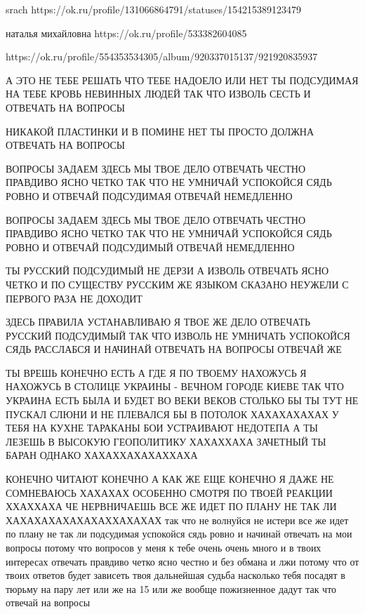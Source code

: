  
 
 
 
 

srach
https://ok.ru/profile/131066864791/statuses/154215389123479

наталья михайловна
https://ok.ru/profile/533382604085

https://ok.ru/profile/554353534305/album/920337015137/921920835937

А ЭТО НЕ ТЕБЕ РЕШАТЬ ЧТО ТЕБЕ НАДОЕЛО ИЛИ НЕТ ТЫ ПОДСУДИМАЯ НА ТЕБЕ КРОВЬ
НЕВИННЫХ ЛЮДЕЙ ТАК ЧТО ИЗВОЛЬ СЕСТЬ И ОТВЕЧАТЬ НА ВОПРОСЫ

НИКАКОЙ ПЛАСТИНКИ И В ПОМИНЕ НЕТ ТЫ ПРОСТО ДОЛЖНА ОТВЕЧАТЬ НА ВОПРОСЫ

ВОПРОСЫ ЗАДАЕМ ЗДЕСЬ МЫ ТВОЕ ДЕЛО ОТВЕЧАТЬ ЧЕСТНО ПРАВДИВО ЯСНО ЧЕТКО ТАК ЧТО
НЕ УМНИЧАЙ УСПОКОЙСЯ СЯДЬ РОВНО И ОТВЕЧАЙ ПОДСУДИМАЯ ОТВЕЧАЙ НЕМЕДЛЕННО

ВОПРОСЫ ЗАДАЕМ ЗДЕСЬ МЫ ТВОЕ ДЕЛО ОТВЕЧАТЬ ЧЕСТНО ПРАВДИВО ЯСНО ЧЕТКО ТАК ЧТО
НЕ УМНИЧАЙ УСПОКОЙСЯ СЯДЬ РОВНО И ОТВЕЧАЙ ПОДСУДИМЫЙ ОТВЕЧАЙ НЕМЕДЛЕННО

ТЫ РУССКИЙ ПОДСУДИМЫЙ НЕ ДЕРЗИ А ИЗВОЛЬ ОТВЕЧАТЬ ЯСНО ЧЕТКО И ПО СУЩЕСТВУ
РУССКИМ ЖЕ ЯЗЫКОМ СКАЗАНО НЕУЖЕЛИ С ПЕРВОГО РАЗА НЕ ДОХОДИТ

ЗДЕСЬ ПРАВИЛА УСТАНАВЛИВАЮ Я ТВОЕ ЖЕ ДЕЛО ОТВЕЧАТЬ РУССКИЙ ПОДСУДИМЫЙ ТАК ЧТО
ИЗВОЛЬ НЕ УМНИЧАТЬ УСПОКОЙСЯ СЯДЬ РАССЛАБСЯ И НАЧИНАЙ ОТВЕЧАТЬ НА ВОПРОСЫ
ОТВЕЧАЙ ЖЕ

ТЫ ВРЕШЬ КОНЕЧНО ЕСТЬ А ГДЕ Я ПО ТВОЕМУ НАХОЖУСЬ Я НАХОЖУСЬ В СТОЛИЦЕ УКРАИНЫ -
ВЕЧНОМ ГОРОДЕ КИЕВЕ ТАК ЧТО УКРАИНА ЕСТЬ БЫЛА И БУДЕТ ВО ВЕКИ ВЕКОВ СТОЛЬКО БЫ
ТЫ ТУТ НЕ ПУСКАЛ СЛЮНИ И НЕ ПЛЕВАЛСЯ БЫ В ПОТОЛОК ХАХАХАХАХАХ У ТЕБЯ НА КУХНЕ
ТАРАКАНЫ БОИ УСТРАИВАЮТ НЕДОТЕПА А ТЫ ЛЕЗЕШЬ В ВЫСОКУЮ ГЕОПОЛИТИКУ ХАХАХХАХА
ЗАЧЕТНЫЙ ТЫ БАРАН ОДНАКО ХАХАХХАХАХАХХАХА

КОНЕЧНО ЧИТАЮТ КОНЕЧНО А КАК ЖЕ ЕЩЕ КОНЕЧНО Я ДАЖЕ НЕ СОМНЕВАЮСЬ ХАХАХАХ
ОСОБЕННО СМОТРЯ ПО ТВОЕЙ РЕАКЦИИ ХХАХХАХА ЧЕ НЕРВНИЧАЕШЬ ВСЕ ЖЕ ИДЕТ ПО ПЛАНУ
НЕ ТАК ЛИ ХАХАХАХАХАХАХАХХАХАХАХ так что не волнуйся не истери все же идет по плану не так 
ли подсудимая успокойся сядь ровно и начинай отвечать на мои вопросы потому что вопросов у меня к тебе 
очень очень много и в твоих интересах отвечать правдиво четко ясно честно и без обмана и лжи
потому что от твоих ответов будет зависеть твоя дальнейшая судьба насколько тебя посадят в тюрьму
на пару лет или же на 15 или же вообще пожизненное дадут так что отвечай на вопросы

